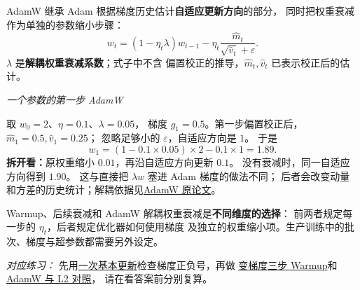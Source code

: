 AdamW 继承 Adam 根据梯度历史估计\textbf{自适应更新方向}的部分，
同时把权重衰减作为单独的参数缩小步骤：
\begin{equation}
w_t=(1-\eta_t\lambda)w_{t-1}
-\eta_t\frac{\widehat{m}_t}{\sqrt{\widehat{v}_t}+\varepsilon}.
\label{eq:adamw-decoupled}
\end{equation}
$\lambda$ 是\textbf{解耦权重衰减系数}；式子中不含
偏置校正的推导，$\widehat{m}_t,\widehat{v}_t$ 已表示校正后的估计。

\begin{example}
\noindent\emph{一个参数的第一步 AdamW}\par
取 $w_0=2$、$\eta=0.1$、$\lambda=0.05$，
梯度 $g_1=0.5$。第一步偏置校正后，
$\widehat{m}_1=0.5,\widehat{v}_1=0.25$；
忽略足够小的 $\varepsilon$，自适应方向是 $1$。
于是
\[
w_1=(1-0.1\times0.05)\times2-0.1\times1
=\boxed{1.89}.
\]
\textbf{拆开看：}原权重缩小 $0.01$，再沿自适应方向更新 $0.1$。
没有衰减时，同一自适应方向得到 $1.90$。
这与直接把 $\lambda w$ 塞进 Adam 梯度的做法不同；
后者会改变动量和方差的历史统计；解耦依据见\hyperref[source:adamw]{AdamW 原论文}。
\end{example}

Warmup、后续衰减和 AdamW 解耦权重衰减是\textbf{不同维度的选择}：
前两者规定每一步的 $\eta_t$，后者规定优化器如何使用梯度
及独立的权重缩小项。生产训练中的批次、梯度与超参数都需要另外设定。


\noindent\emph{对应练习：}
先用\hyperref[exercise:optimizer-basic-step]{一次基本更新}检查梯度正负号，再做
\hyperref[exercise:optimizer-warmup]{变梯度三步 Warmup}和
\hyperref[exercise:optimizer-adamw]{AdamW 与 L2 对照}，
请在看答案前分别复算。

